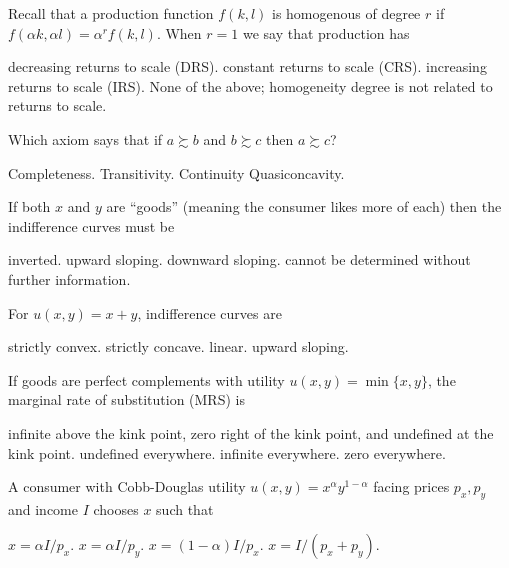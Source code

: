 \documentclass[addpoints,answers,12pt]{exam}
\begin{document}
\begin{questions}
\question[1] Recall that a production function $f(k,l)$ is homogenous of degree $r$ if\\
$f(\alpha k,\alpha l)=\alpha^r f(k,l)$. When $r=1$ we say that production has
\begin{choices}
    \choice decreasing returns to scale (DRS).
    \CorrectChoice constant returns to scale (CRS).
    \choice increasing returns to scale (IRS).
    \choice None of the above; homogeneity degree is not related to returns to scale.
\end{choices}

\question[1] Which axiom says that if $a\succsim b$ and $b\succsim c$ then $a\succsim c$?
\begin{choices}
    \choice Completeness.
    \CorrectChoice Transitivity.
    \choice Continuity
    \choice Quasiconcavity.
\end{choices}

\question[1] If both $x$ and $y$ are ``goods'' (meaning the consumer likes more of each) then the indifference curves must be
\begin{choices}
    \choice inverted.
    \choice upward sloping.
    \CorrectChoice downward sloping.
    \choice cannot be determined without further information.
\end{choices}

\question[1] For $u(x,y)=x+y$, indifference curves are
\begin{choices}
    \choice strictly convex.
    \choice strictly concave.
    \CorrectChoice linear.
    \choice upward sloping.
\end{choices}

\newpage
\question[1] If goods are perfect complements with utility $u(x,y)=\min\{x,y\}$, the marginal rate of substitution (MRS) is
\begin{choices}
    \CorrectChoice infinite above the kink point, zero right of the kink point, and undefined at the kink point.
    \choice undefined everywhere.
    \choice infinite everywhere.
    \choice zero everywhere.
\end{choices}

\question[1] A consumer with Cobb-Douglas utility $u(x,y)=x^{\alpha}y^{1-\alpha}$ facing prices $p_x,p_y$ and income $I$ chooses $x$ such that
\begin{choices}
    \CorrectChoice $x = \alpha I/p_x$.
    \choice $x = \alpha I/p_y$.
    \choice $x = (1-\alpha)I/p_x$.
    \choice $x = I/(p_x + p_y)$.
\end{choices}


\end{questions}
\end{document}
